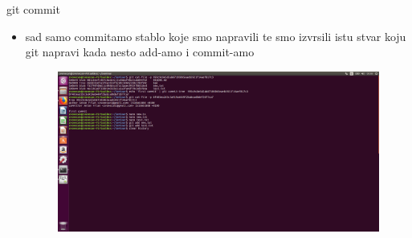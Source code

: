 \documentclass[]{beamer}
\begin{document}
\begin{frame}{git commit}

\begin{itemize}
	\item sad samo commitamo stablo koje smo napravili te smo izvrsili istu stvar koju git napravi kada nesto add-amo i commit-amo
	\begin{figure}
		\centering
	\includegraphics[scale=.48]{./slike/sedma_slika.jpg}
	\end{figure}
\end{itemize}
\end{frame}
\end{document}
